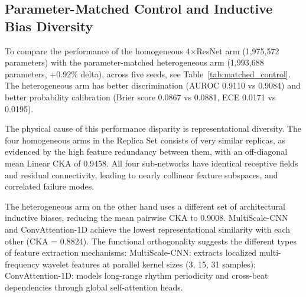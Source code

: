 \documentclass{ICIC2026}
\begin{document}
\subsection{Parameter-Matched Control and Inductive Bias Diversity}
\label{subsec:res_diversity}

To compare the performance of the homogeneous 4$\times$ResNet arm (1,975,572 parameters) with the parameter-matched heterogeneous arm (1,993,688 parameters, +0.92\% delta), across five seeds, see Table~\ref{tab:matched_control}. The heterogeneous arm has better discrimination (AUROC 0.9110 vs 0.9084) and better probability calibration (Brier score 0.0867 vs 0.0881, ECE 0.0171 vs 0.0195).

\begin{table}[t]
\caption{Parameter-Matched Control (5 Seeds)}
\label{tab:matched_control}
\centering
\begin{ICICtable}
\end{ICICtable}
\end{table}

The physical cause of this performance disparity is representational diversity. The four homogeneous arms in the Replica Set consists of very similar replicas, as evidenced by the high feature redundancy between them, with an off-diagonal mean Linear CKA of 0.9458. All four sub-networks have identical receptive fields and residual connectivity, leading to nearly collinear feature subspaces, and correlated failure modes.

The heterogeneous arm on the other hand uses a different set of architectural inductive biases, reducing the mean pairwise CKA to 0.9008. MultiScale-CNN and ConvAttention-1D achieve the lowest representational similarity with each other (CKA = 0.8824). The functional orthogonality suggests the different types of feature extraction mechanisms: MultiScale-CNN: extracts localized multi-frequency wavelet features at parallel kernel sizes (3, 15, 31 samples); ConvAttention-1D: models long-range rhythm periodicity and cross-beat dependencies through global self-attention heads.
\end{document}
